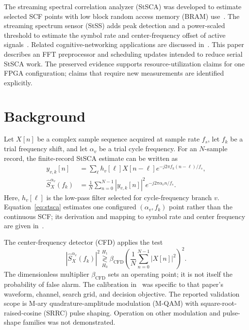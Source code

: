 \documentclass[conference]{IEEEtran}
\begin{document}
The streaming spectral correlation analyzer (StSCA) was developed to estimate selected SCF points with low block random access memory (BRAM) use~\cite{gormley-msee21}. The streaming spectrum sensor (StSS) adds peak detection and a power-scaled threshold to estimate the symbol rate and center-frequency offset of active signals~\cite{gormley-ccaaw21}. Related cognitive-networking applications are discussed in~\cite{gormley-ccaaw21,dudukovich-rfid22}. This paper describes an FFT preprocessor and scheduling updates intended to reduce serial StSCA work. The preserved evidence supports resource-utilization claims for one FPGA configuration; claims that require new measurements are identified explicitly.

\section{Background}
Let $X[n]$ be a complex sample sequence acquired at sample rate $f_s$, let $f_k$ be a trial frequency shift, and let $\alpha_v$ be a trial cycle frequency. For an $N$-sample record, the finite-record StSCA estimate can be written as
\begin{align}
y_{v,k}[n] &= \sum_{\ell} h_v[\ell]X[n-\ell]
e^{-j2\pi f_k(n-\ell)/f_s}, \label{eq:channelized}\\
\widehat{S}_{X}^{\alpha_v}(f_k) &= \frac{1}{N}\sum_{n=0}^{N-1}
|y_{v,k}[n]|^2 e^{-j2\pi\alpha_v n/f_s}. \label{eq:stsca}
\end{align}
Here, $h_v[\ell]$ is the low-pass filter selected for cycle-frequency branch $v$. Equation~\eqref{eq:stsca} estimates one configured $(\alpha_v,f_k)$ point rather than the continuous SCF; its derivation and mapping to symbol rate and center frequency are given in~\cite{gormley-msee21}.

The center-frequency detector (CFD) applies the test
\begin{equation}\label{eq:cfd}
|\widehat{S}_{X}^{\alpha_v}(f_k)|^2
\underset{H_0}{\overset{H_1}{\gtrless}}
\beta_{\mathrm{CFD}}{\left(\frac{1}{N}\sum_{n=0}^{N-1}|X[n]|^2\right)}^{2}.
\end{equation}
The dimensionless multiplier $\beta_{\mathrm{CFD}}$ sets an operating point; it is not itself the probability of false alarm. The calibration in~\cite{gormley-ccaaw21} was specific to that paper's waveform, channel, search grid, and decision objective. The reported validation scope is M-ary quadrature-amplitude modulation (M-QAM) with square-root-raised-cosine (SRRC) pulse shaping. Operation on other modulation and pulse-shape families was not demonstrated.
\end{document}
